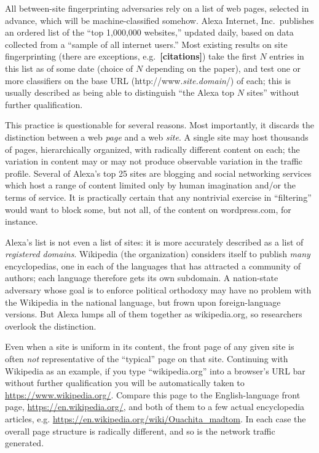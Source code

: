 \documentclass{zarticle}
\def\todo#1{{\color{todocolor}\bfseries [#1]}}
\begin{document}
All between-site fingerprinting adversaries rely on a list of web
pages, selected in advance, which will be machine-classified somehow.
Alexa Internet, Inc.\ publishes an ordered list of the “top 1,000,000
websites,” updated daily, based on data collected from a “sample of
all internet users.”%
Most existing results on site fingerprinting (there are exceptions,
e.g.~\todo{citations}) take the first $N$ entries in this list as of
some date (choice of $N$ depending on the paper), and test one or more
classifiers on the base URL
(\textsf{http://www.\textit{site.domain}/}) of each; this is usually
described as being able to distinguish “the Alexa top $N$ sites”
without further qualification.

This practice is questionable for several reasons.  Most importantly,
it discards the distinction between a web \emph{page} and a web
\emph{site}.  A single site may host thousands of pages,
hierarchically organized, with radically different content on each;
the variation in content may or may not produce observable variation
in the traffic profile.  Several of Alexa's top 25 sites are blogging
and social networking services which host a range of content limited
only by human imagination and/or the terms of service.  It is
practically certain that any nontrivial exercise in “filtering” would
want to block some, but not all, of the content on
\textsf{wordpress.com}, for instance.

Alexa's list is not even a list of sites: it is more accurately
described as a list of \emph{registered domains}.  Wikipedia (the
organization) considers itself to publish \emph{many} encyclopedias,
one in each of the languages that has attracted a community of
authors; each language therefore gets its own subdomain.  A
nation-state adversary whose goal is to enforce political orthodoxy
may have no problem with the Wikipedia in the national language, but
frown upon foreign-language versions.  But Alexa lumps all of them
together as \textsf{wikipedia.org}, so researchers overlook the
distinction.

Even when a site is uniform in its content, the front page of any
given site is often \emph{not} representative of the “typical” page on
that site. Continuing with Wikipedia as an example, if you type
“\textsf{wikipedia.org}” into a browser's URL bar without further
qualification you will be automatically taken to
\url{https://www.wikipedia.org/}.  Compare this page to the
English-language front page, \url{https://en.wikipedia.org/}, and both
of them to a few actual encyclopedia articles,
e.g. \url{https://en.wikipedia.org/wiki/Ouachita_madtom}.  In each
case the overall page structure is radically different, and so is the
network traffic generated.
\end{document}
